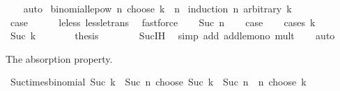 \begin{isabellebody}
\ \ \isamarkupfalse%
\ auto\isanewline
{}\isamarkupfalse%
%
\endisatagproof
{\isafoldproof}%
%
\isadelimproof
\isanewline
%
\endisadelimproof
\isanewline
{}\isamarkupfalse%
\ binomial{\isacharunderscore}{\kern0pt}le{\isacharunderscore}{\kern0pt}pow{}{\isacharcolon}{\kern0pt}\ {\isachardoublequoteopen}n\ choose\ k\ {\isasymle}\ {}{\isacharcircum}{\kern0pt}n{\isachardoublequoteclose}\isanewline
%
\isadelimproof
%
\endisadelimproof
%
\isatagproof
{}\isamarkupfalse%
\ {\isacharparenleft}{\kern0pt}induction\ n\ arbitrary{\isacharcolon}{\kern0pt}\ k{\isacharparenright}{\kern0pt}\isanewline
\ \ \isamarkupfalse%
\ {}\isanewline
\ \ \isamarkupfalse%
\ \isamarkupfalse%
\ {\isacharquery}{\kern0pt}case\isanewline
\ \ \ \ \isamarkupfalse%
\ le{\isacharunderscore}{\kern0pt}less\ less{\isacharunderscore}{\kern0pt}le{\isacharunderscore}{\kern0pt}trans\ \isamarkupfalse%
\ fastforce\isanewline
{}\isamarkupfalse%
\isanewline
\ \ \isamarkupfalse%
\ {\isacharparenleft}{\kern0pt}Suc\ n{\isacharparenright}{\kern0pt}\isanewline
\ \ \isamarkupfalse%
\ {\isacharquery}{\kern0pt}case\isanewline
\ \ \isamarkupfalse%
\ {\isacharparenleft}{\kern0pt}cases\ k{\isacharparenright}{\kern0pt}\isanewline
\ \ \ \ \isamarkupfalse%
\ {\isacharparenleft}{\kern0pt}Suc\ k{\isacharprime}{\kern0pt}{\isacharparenright}{\kern0pt}\isanewline
\ \ \ \ \isamarkupfalse%
\ \isamarkupfalse%
\ {\isacharquery}{\kern0pt}thesis\isanewline
\ \ \ \ \ \ \isamarkupfalse%
\ Suc{\isachardot}{\kern0pt}IH\ \isamarkupfalse%
\ {\isacharparenleft}{\kern0pt}simp\ add{\isacharcolon}{\kern0pt}\ add{\isacharunderscore}{\kern0pt}le{\isacharunderscore}{\kern0pt}mono\ mult{\isacharunderscore}{\kern0pt}{}{\isacharparenright}{\kern0pt}\isanewline
\ \ \isamarkupfalse%
\ auto\isanewline
{}\isamarkupfalse%
%
\endisatagproof
{\isafoldproof}%
%
\isadelimproof
%
\endisadelimproof
%
\begin{isamarkuptext}%
The absorption property.%
\end{isamarkuptext}\isamarkuptrue%
\isamarkupfalse%
\ Suc{\isacharunderscore}{\kern0pt}times{\isacharunderscore}{\kern0pt}binomial{\isacharcolon}{\kern0pt}\ {\isachardoublequoteopen}Suc\ k\ {\isacharasterisk}{\kern0pt}\ {\isacharparenleft}{\kern0pt}Suc\ n\ choose\ Suc\ k{\isacharparenright}{\kern0pt}\ {\isacharequal}{\kern0pt}\ Suc\ n\ {\isacharasterisk}{\kern0pt}\ {\isacharparenleft}{\kern0pt}n\ choose\ k{\isacharparenright}{\kern0pt}{\isachardoublequoteclose}\isanewline

\end{isabellebody}
